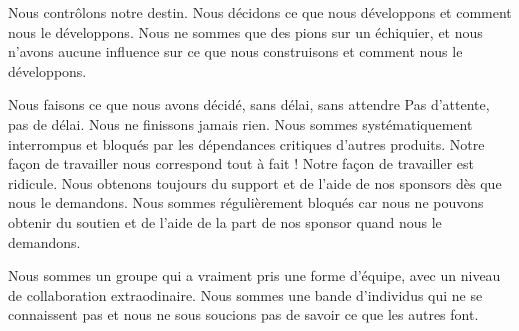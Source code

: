 \documentclass[a4paper]{article}
\begin{document}
\clearpage
%
 {Nous contrôlons notre destin. Nous d\'ecidons ce que nous d\'eveloppons et comment nous le d\'eveloppons.}
 {Nous ne sommes que des pions sur un \'echiquier, et nous n'avons aucune influence sur ce que nous construisons et comment nous le d\'eveloppons.}
 
 
 \clearpage
{}
  {Nous faisons ce que nous avons d\'ecid\'e, sans délai, sans attendre Pas d'attente, pas de d\'elai.}
  {Nous ne finissons jamais rien. Nous sommes syst\'ematiquement interrompus et bloqu\'es par les d\'ependances critiques d'autres produits.}
  \clearpage
{}
  {Notre fa\c{c}on de travailler nous correspond tout à fait !}
  {Notre fa\c{c}on de travailler est ridicule.}
%
\clearpage
{}
  {Nous obtenons toujours du support et de l'aide de nos sponsors dès que nous le demandons.}
  {Nous sommes r\'egulièrement bloqu\'es car nous ne pouvons obtenir du soutien et de l'aide de la part de nos sponsor quand nous le demandons.}
%

\clearpage

  {Nous sommes un groupe qui a vraiment pris une forme d'\'equipe, avec un niveau de collaboration extraodinaire.}
  {Nous sommes une bande d'individus qui ne se connaissent pas et nous ne sous soucions pas de savoir ce que les autres font.}
%



\restoregeometry
\end{document}
